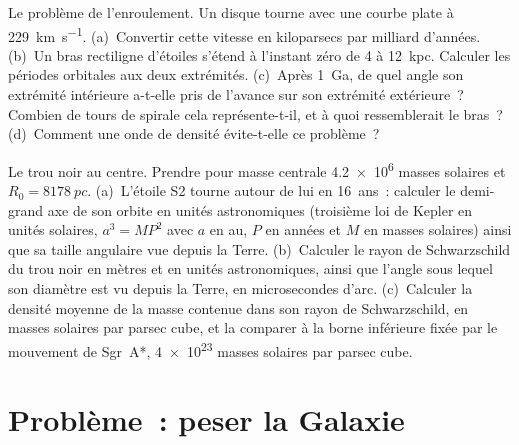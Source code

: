 \begin{exercise}[$\star\star\star$]\label{exo:b3:milky-way-galaxies:11}
Le problème de l'enroulement. Un disque tourne avec une courbe plate à
\qty{229}{km.s^{-1}}. (a)~Convertir cette vitesse en kiloparsecs par milliard
d'années. (b)~Un bras rectiligne d'étoiles s'étend à l'instant zéro de 4 à
\qty{12}{kpc}. Calculer les périodes orbitales aux deux extrémités. (c)~Après
\qty{1}{Ga}, de quel angle son extrémité intérieure a-t-elle pris de l'avance
sur son extrémité extérieure~? Combien de tours de spirale cela représente-t-il, et à quoi
ressemblerait le bras~? (d)~Comment une onde de densité évite-t-elle ce problème~?
\end{exercise}

\begin{exercise}[$\star\star\star$]\label{exo:b3:milky-way-galaxies:12}
Le trou noir au centre. Prendre pour masse centrale
\num{4.2e6} masses solaires et $R_0 = \qty{8178}{pc}$. (a)~L'étoile S2
tourne autour de lui en \num{16}~ans~: calculer le demi-grand axe de son orbite en
unités astronomiques (troisième loi de Kepler en unités solaires, $a^3 = MP^2$ avec
$a$ en au, $P$ en années et $M$ en masses solaires) ainsi que sa taille angulaire vue
depuis la Terre. (b)~Calculer le rayon de Schwarzschild du trou noir en
mètres et en unités astronomiques, ainsi que l'angle sous lequel son diamètre
est vu depuis la Terre, en microsecondes d'arc. (c)~Calculer la densité moyenne
de la masse contenue dans son rayon de Schwarzschild, en masses solaires par
parsec cube, et la comparer à la borne inférieure fixée par le mouvement de Sgr~A*,
\num{4e23} masses solaires par parsec cube.
\end{exercise}

\section{Problème~: peser la Galaxie}

